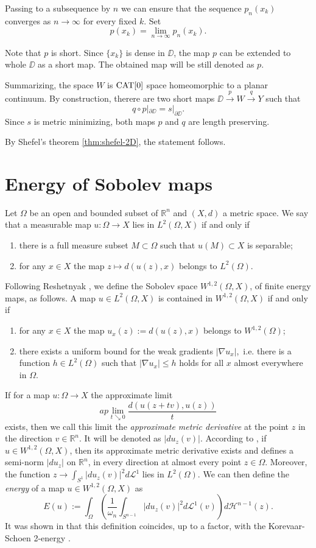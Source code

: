 \documentclass[a4paper,10pt]{amsart}
\begin{document}
Passing to a subsequence by $n$ we can ensure that the sequence
$p_n(x_k)$ converges as $n\to\infty$ for every fixed $k$.
Set 
\[p(x_k)=\lim_{n\to\infty} p_n(x_k).\]

Note that $p$ is short.
Since $\{x_k\}$ is dense in $\DD$,
the map $p$ can be extended to whole $\DD$ 
as a short map.
The obtained map will be still denoted as $p$.

Summarizing, the space $W$ is $\mathop{\rm CAT}\nolimits[0]$ space 
homeomorphic to a planar continuum.
By construction, therere are two short maps 
$\DD\xrightarrow{p} W \xrightarrow{q} Y$
such that 
\[q\circ p|_{\partial\DD}=s|_{\partial\DD}.\]
Since $s$ is metric minimizing, both maps $p$ and $q$ are length preserving.

By Shefel's theorem \ref{thm:shefel-2D}, the statement follows.\qeds

\section{Energy of Sobolev maps}


Let $\Omega$ be an open and bounded subset of $\mathbb{R}^n$ and $(X,d)$ a metric space.
We say that a measurable map $u:\Omega\to X$ lies in 
$L^2(\Omega,X)$ if and only if
\begin{enumerate}
 \item there is a full measure subset $M\subset \Omega$ such that $u(M)\subset X$ is separable;
 \item for any $x\in X$ the map $z\mapsto d(u(z),x)$ belongs to $L^2(\Omega)$.
\end{enumerate}

Following Reshetnyak \cite{R}, we define the Sobolev space $W^{1,2}(\Omega,X)$, of finite energy maps, as follows. 
A map $u\in L^2(\Omega,X)$ is contained in $W^{1,2}(\Omega,X)$ if and only if

\begin{enumerate}
 \item for any $x\in X$ the map $u_x(z):=d(u(z),x)$ belongs to $W^{1,2}(\Omega)$;
 \item there exists a uniform bound for the weak gradients $|\nabla u_x|$,\ i.e. there is a function $h\in L^2(\Omega)$ 
 such that $|\nabla u_x|\leq h$ holds for all $x$ almost everywhere in $\Omega$. 
\end{enumerate}

If for a map $u:\Omega\to X$ the  approximate limit
$$
ap\lim_{t\searrow 0}\frac{d(u(z+tv),u(z))}{t}
$$
exists, then we call this limit the {\em approximate metric derivative} at the point $z$ in the direction $v\in\mathbb{R}^n$. It will be denoted
as $|du_z(v)|$. According to
\cite[Prop.4.3]{LW}, if $u\in W^{1,2}(\Omega,X)$, then its approximate metric derivative exists and defines a semi-norm $|du_z|$ on $\mathbb{R}^n$, 
in every direction at almost every point $z\in\Omega$. Moreover, the function $z\to\int_{S^1}|du_z(v)|^2 d\mathcal{L}^1$ lies in $L^2(\Omega)$.
We can then define the {\em energy} of a map $u\in W^{1,2}(\Omega,X)$ as
$$
E(u):=\int_\Omega\left(\frac{1}{\omega_n}\int_{S^{n-1}}|du_z(v)|^2 d\mathcal{L}^1(v)\right)d\mathcal{H}^{n-1}(z).
$$
It was shown in \cite{LW} that this definition coincides, up to a factor, with the Korevaar-Schoen 2-energy \cite{KS}.
\end{document}
